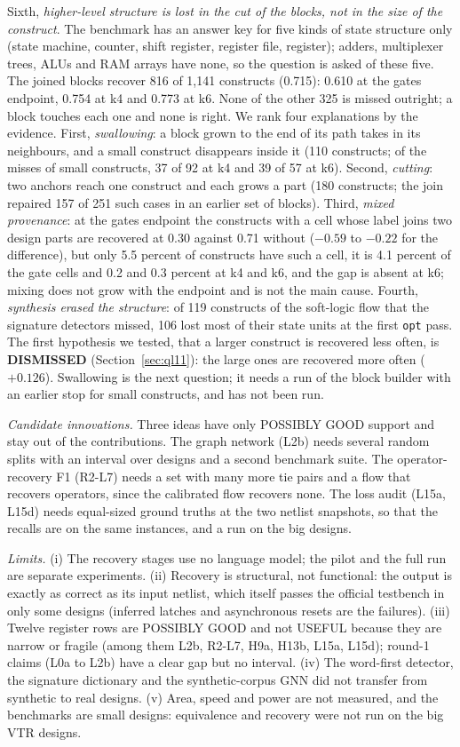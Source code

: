 \documentclass[conference]{IEEEtran}
\newcommand{\verdict}[1]{\textbf{\textsc{#1}}}
\newcommand{\code}[1]{\texttt{#1}}
\begin{document}
Sixth, \emph{higher-level structure is lost in the cut of the blocks, not in the size of the construct}. The benchmark has an answer key for five kinds of state structure only (state machine, counter, shift register, register file, register); adders, multiplexer trees, ALUs and RAM arrays have none, so the question is asked of these five. The joined blocks recover 816 of 1,141 constructs (0.715): 0.610 at the gates endpoint, 0.754 at k4 and 0.773 at k6. None of the other 325 is missed outright; a block touches each one and none is right. We rank four explanations by the evidence. First, \emph{swallowing}: a block grown to the end of its path takes in its neighbours, and a small construct disappears inside it (110 constructs; of the misses of small constructs, 37 of 92 at k4 and 39 of 57 at k6). Second, \emph{cutting}: two anchors reach one construct and each grows a part (180 constructs; the join repaired 157 of 251 such cases in an earlier set of blocks). Third, \emph{mixed provenance}: at the gates endpoint the constructs with a cell whose label joins two design parts are recovered at 0.30 against 0.71 without ($-0.59$ to $-0.22$ for the difference), but only 5.5 percent of constructs have such a cell, it is 4.1 percent of the gate cells and 0.2 and 0.3 percent at k4 and k6, and the gap is absent at k6; mixing does not grow with the endpoint and is not the main cause. Fourth, \emph{synthesis erased the structure}: of 119 constructs of the soft-logic flow that the signature detectors missed, 106 lost most of their state units at the first \code{opt} pass. The first hypothesis we tested, that a larger construct is recovered less often, is \verdict{DISMISSED} (Section~\ref{sec:ql11}): the large ones are recovered more often ($+0.126$). Swallowing is the next question; it needs a run of the block builder with an earlier stop for small constructs, and has not been run.

\emph{Candidate innovations.} Three ideas have only POSSIBLY GOOD support and stay out of the contributions.
The graph network (L2b) needs several random splits with an interval over designs and a second benchmark
suite. The operator-recovery F1 (R2-L7) needs a set with many more tie pairs and a flow that recovers
operators, since the calibrated flow recovers none. The loss audit (L15a, L15d) needs equal-sized
ground truths at the two netlist snapshots, so that the recalls are on the same instances, and a run on the
big designs.

\emph{Limits.} (i) The recovery stages use no language model; the pilot and the full run are separate experiments. (ii) Recovery is structural, not functional: the output is exactly as correct as its input
netlist, which itself passes the official testbench in only some designs (inferred latches and asynchronous
resets are the failures). (iii) Twelve register rows are POSSIBLY GOOD and not USEFUL because they are narrow or fragile (among them L2b, R2-L7, H9a, H13b, L15a, L15d); round-1 claims (L0a to L2b) have a clear gap but no interval. (iv)
The word-first detector, the signature dictionary and the synthetic-corpus GNN did not transfer from
synthetic to real designs. (v) Area, speed and power are not measured, and the benchmarks are small
designs: equivalence and recovery were not run on the big VTR designs.
\end{document}
